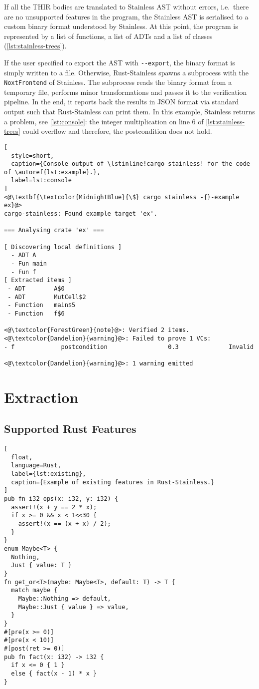 If all the THIR bodies are translated to Stainless AST without errors,
i.e.~there are no unsupported features in the program, the Stainless AST is
serialised to a custom binary format understood by Stainless. At this point, the
program is represented by a list of functions, a list of ADTs and a list of
classes (\autoref{lst:stainless-trees}).

If the user specified to export the AST with \lstinline!--export!, the binary
format is simply written to a file. Otherwise, Rust-Stainless spawns a
subprocess with the \lstinline!NoxtFrontend! of Stainless. The subprocess reads
the binary format from a temporary file, performs minor transformations and
passes it to the verification pipeline. In the end, it reports back the results
in JSON format via standard output such that Rust-Stainless can print them. In
this example, Stainless returns a problem, see \autoref{lst:console}: the
integer multiplication on line 6 of \autoref{lst:stainless-trees} could overflow
and therefore, the postcondition does not hold.

\begin{lstlisting}[
  style=short,
  caption={Console output of \lstinline!cargo stainless! for the code of \autoref{lst:example}.},
  label=lst:console
]
<@\textbf{\textcolor{MidnightBlue}{\$} cargo stainless -{}-example ex}@>
cargo-stainless: Found example target 'ex'.

=== Analysing crate 'ex' ===

[ Discovering local definitions ]
  - ADT A
  - Fun main
  - Fun f
[ Extracted items ]
 - ADT        A$0
 - ADT        MutCell$2
 - Function   main$5
 - Function   f$6

<@\textcolor{ForestGreen}{note}@>: Verified 2 items.
<@\textcolor{Dandelion}{warning}@>: Failed to prove 1 VCs:
- f             postcondition                 0.3              Invalid

<@\textcolor{Dandelion}{warning}@>: 1 warning emitted
\end{lstlisting}


\section{Extraction}

\subsection{Supported Rust Features}
\label{sec:supported-features}

\begin{lstlisting}[
  float,
  language=Rust,
  label={lst:existing},
  caption={Example of existing features in Rust-Stainless.}
]
pub fn i32_ops(x: i32, y: i32) {
  assert!(x + y == 2 * x);
  if x >= 0 && x < 1<<30 {
    assert!(x == (x + x) / 2);
  }
}
enum Maybe<T> {
  Nothing,
  Just { value: T }
}
fn get_or<T>(maybe: Maybe<T>, default: T) -> T {
  match maybe {
    Maybe::Nothing => default,
    Maybe::Just { value } => value,
  }
}
#[pre(x >= 0)]
#[pre(x < 10)]
#[post(ret >= 0)]
pub fn fact(x: i32) -> i32 {
  if x <= 0 { 1 }
  else { fact(x - 1) * x }
}
\end{lstlisting}

